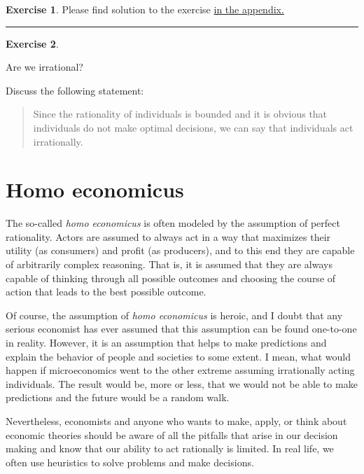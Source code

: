 \documentclass[
  12pt,
  oneside]{book}
\theoremstyle{definition}
\theoremstyle{definition}
\theoremstyle{definition}
\newtheorem{exercise}{Exercise}[chapter]
\theoremstyle{definition}
\theoremstyle{remark}
\begin{document}
\begin{exercise}
Please find solution to the exercise \protect\hyperlink{sol:opti-sati}{in the appendix.}

\begin{center}\rule{0.5\linewidth}{0.5pt}\end{center}

\end{exercise}

\begin{exercise}
\protect\hypertarget{exr:irrational}{}\label{exr:irrational}

Are we irrational?

Discuss the following statement:

\begin{quote}
Since the rationality of individuals is bounded and it is obvious that individuals do not make optimal decisions, we can say that individuals act irrationally.
\end{quote}

\end{exercise}

\hypertarget{homo-economicus}{%
\section{Homo economicus}\label{homo-economicus}}

The so-called \emph{homo economicus} is often modeled by the assumption of perfect rationality. Actors are assumed to always act in a way that maximizes their utility (as consumers) and profit (as producers), and to this end they are capable of arbitrarily complex reasoning. That is, it is assumed that they are always capable of thinking through all possible outcomes and choosing the course of action that leads to the best possible outcome.

Of course, the assumption of \emph{homo economicus} is heroic, and I doubt that any serious economist has ever assumed that this assumption can be found one-to-one in reality. However, it is an assumption that helps to make predictions and explain the behavior of people and societies to some extent. I mean, what would happen if microeconomics went to the other extreme assuming irrationally acting individuals. The result would be, more or less, that we would not be able to make predictions and the future would be a random walk.

Nevertheless, economists and anyone who wants to make, apply, or think about economic theories should be aware of all the pitfalls that arise in our decision making and know that our ability to act rationally is limited. In real life, we often use heuristics to solve problems and make decisions.
\end{document}

